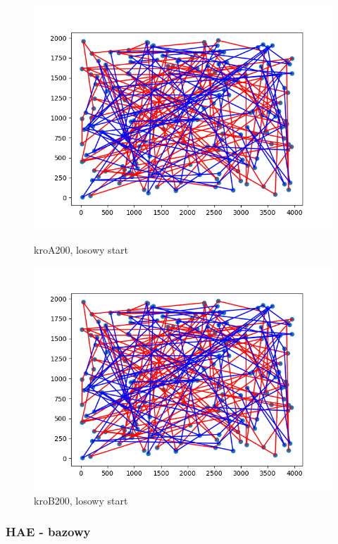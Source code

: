 \documentclass[11pt]{article}
\begin{document}
\begin{figure}[H]
    \begin{minipage}[t]{0.45\textwidth}
        \centering
        \includegraphics[width=\linewidth]{best_paths/kroA200/LNS_bez}
        \caption{kroA200, losowy start}
    \end{minipage}
    \hfill
    \begin{minipage}[t]{0.45\textwidth}
        \centering
        \includegraphics[width=\linewidth]{best_paths/kroB200/LNS_bez}
        \caption{kroB200, losowy start}
    \end{minipage}\label{fig:figure4}
\end{figure}

\subsubsection{HAE - bazowy}
\end{document}
